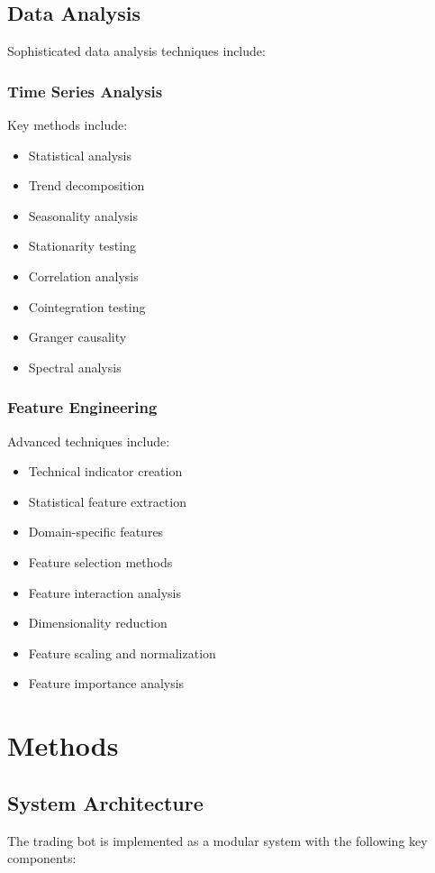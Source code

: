\documentclass[conference]{IEEEtran}
\begin{document}
\subsection{Data Analysis}
Sophisticated data analysis techniques include:

\subsubsection{Time Series Analysis}
Key methods include:
\begin{itemize}
    \item Statistical analysis
    \item Trend decomposition
    \item Seasonality analysis
    \item Stationarity testing
    \item Correlation analysis
    \item Cointegration testing
    \item Granger causality
    \item Spectral analysis
\end{itemize}

\subsubsection{Feature Engineering}
Advanced techniques include:
\begin{itemize}
    \item Technical indicator creation
    \item Statistical feature extraction
    \item Domain-specific features
    \item Feature selection methods
    \item Feature interaction analysis
    \item Dimensionality reduction
    \item Feature scaling and normalization
    \item Feature importance analysis
\end{itemize}

\section{Methods}
\subsection{System Architecture}
The trading bot is implemented as a modular system with the following key components:
\end{document}
